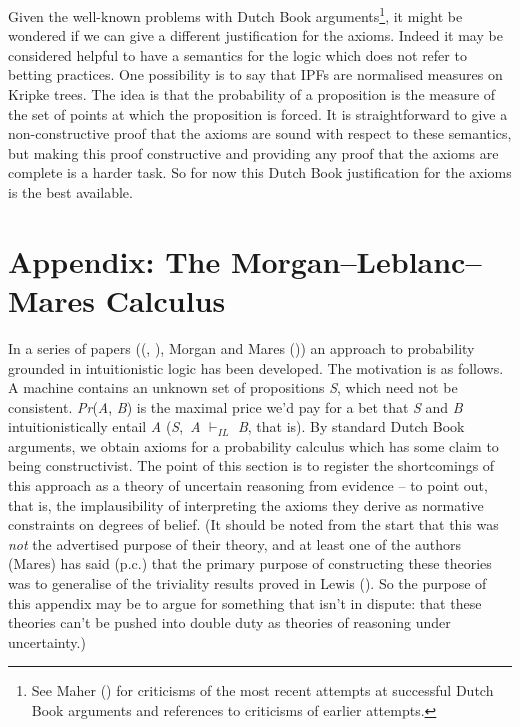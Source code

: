 \documentclass[
  10pt,
  letterpaper,
  DIV=11,
  numbers=noendperiod,
  twoside]{scrartcl}
\begin{document}
Given the well-known problems with Dutch Book arguments\footnote{See
  Maher () for criticisms of the most
  recent attempts at successful Dutch Book arguments and references to
  criticisms of earlier attempts.}, it might be wondered if we can give
a different justification for the axioms. Indeed it may be considered
helpful to have a semantics for the logic which does not refer to
betting practices. One possibility is to say that IPFs are normalised
measures on Kripke trees. The idea is that the probability of a
proposition is the measure of the set of points at which the proposition
is forced. It is straightforward to give a non-constructive proof that
the axioms are sound with respect to these semantics, but making this
proof constructive and providing any proof that the axioms are complete
is a harder task. So for now this Dutch Book justification for the
axioms is the best available.

\section*{Appendix: The Morgan--Leblanc--Mares
Calculus}\label{appendix-the-morganleblancmares-calculus}

In a series of papers ((, ), Morgan and
Mares ()) an approach to probability
grounded in intuitionistic logic has been developed. The motivation is
as follows. A machine contains an unknown set of propositions \emph{S},
which need not be consistent. \emph{Pr}(\emph{A}, \emph{B}) is the
maximal price we'd pay for a bet that \emph{S} and \emph{B}
intuitionistically entail \emph{A} (\emph{S},~\emph{A} \(\vdash_{IL}\)
\emph{B}, that is). By standard Dutch Book arguments, we obtain axioms
for a probability calculus which has some claim to being constructivist.
The point of this section is to register the shortcomings of this
approach as a theory of uncertain reasoning from evidence -- to point
out, that is, the implausibility of interpreting the axioms they derive
as normative constraints on degrees of belief. (It should be noted from
the start that this was \emph{not} the advertised purpose of their
theory, and at least one of the authors (Mares) has said (p.c.) that the
primary purpose of constructing these theories was to generalise of the
triviality results proved in Lewis (). So
the purpose of this appendix may be to argue for something that isn't in
dispute: that these theories can't be pushed into double duty as
theories of reasoning under uncertainty.)
\end{document}
